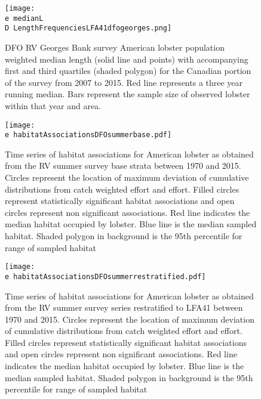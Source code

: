 \documentclass[11pt]{article}
\newcommand{\D}{.}
\newcommand{\e}{/backup/bio_data/bio.lobster/figures/} %
\begin{document}
\begin{figure}

    \texttt{[image: \\e medianL\\D LengthFrequenciesLFA41dfogeorges.png]}
    \caption{DFO RV Georges Bank survey American lobster population weighted median length (solid line and points) with accompanying first and third quartiles (shaded polygon) for the Canadian portion of the survey from 2007 to 2015. Red line represents a three year running median. Bars represent the sample size of observed lobster within that year and area.}

\end{figure}




\begin{figure}

    \texttt{[image: \\e habitatAssociationsDFOsummerbase.pdf]}
    \caption{Time series of habitat associations for American lobster as obtained from the RV summer survey base strata between 1970 and 2015. Circles represent the location of maximum deviation of cumulative distributions from catch weighted effort and effort. Filled circles represent statistically significant habitat associations and open circles represent non significant associations. Red line indicates
the median habitat occupied by lobster. Blue line is the median sampled habitat. Shaded polygon in background is the 95th percentile for range of sampled habitat}

\end{figure}



\begin{figure}

    \texttt{[image: \\e habitatAssociationsDFOsummerrestratified.pdf]}
    \caption{Time series of habitat associations for American lobster as obtained from the RV summer survey series restratified to LFA41 between 1970 and 2015. Circles represent the location of maximum deviation of cumulative distributions from catch weighted effort and effort. Filled circles represent statistically significant habitat associations and open circles represent non significant associations. Red line indicates
the median habitat occupied by lobster. Blue line is the median sampled habitat. Shaded polygon in background is the 95th percentile for range of sampled habitat}

\end{figure}
\end{document}
